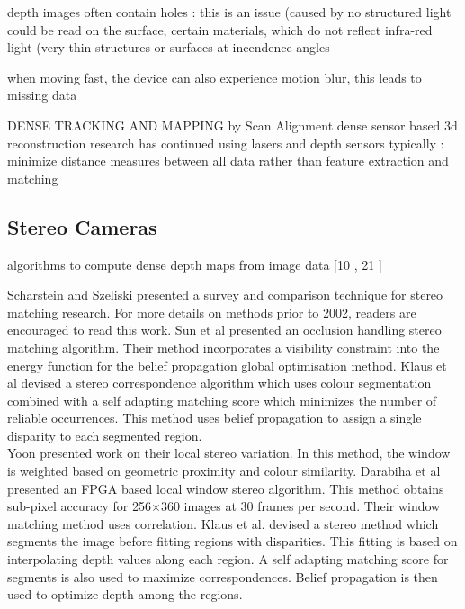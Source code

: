 depth images often contain holes : this is an issue (caused by no structured light could be read on the surface, certain materials, which do not reflect infra-red light (very thin structures or surfaces at incendence angles

when moving fast, the device can also experience motion blur, this leads to missing data


DENSE TRACKING AND MAPPING by Scan Alignment
dense sensor based 3d reconstruction research has continued using lasers and depth sensors
typically : minimize distance measures between all data rather than feature extraction and matching



\subsection{Stereo Cameras}

algorithms to compute dense depth maps from image data [10 \cite{Hirschmuller05Accurate} , 21 \cite{Stuhmer10Real}]


Scharstein and Szeliski \cite{Scharstein02Taxonomy} presented a survey and comparison technique for stereo matching research. For more details on methods prior to 2002, readers are encouraged to read this work. Sun et al \cite{Sun05Symmetric} presented an occlusion handling stereo matching algorithm. Their method incorporates a visibility constraint into the energy function for the belief propagation global optimisation method. Klaus et al \cite{Klaus06Segment} devised a stereo correspondence algorithm which uses colour segmentation combined with a self adapting matching score which minimizes the number of reliable occurrences. This method uses belief propagation to assign a single disparity to each segmented region.\\


Yoon \cite{Yoon06Adaptive} presented work on their local stereo variation. In this method, the window is weighted based on geometric proximity and colour similarity. Darabiha et al \cite{Darabiha06Reconfigurable} presented an FPGA based local window stereo algorithm. This method obtains sub-pixel accuracy for 256$\times$360 images at 30 frames per second. Their window matching method uses correlation. Klaus et al. \cite{Klaus06Segment} devised a stereo method which segments the image before fitting regions with disparities. This fitting is based on interpolating depth values along each region. A self adapting matching score for segments is also used to maximize correspondences. Belief propagation is then used to optimize depth among the regions. \\


